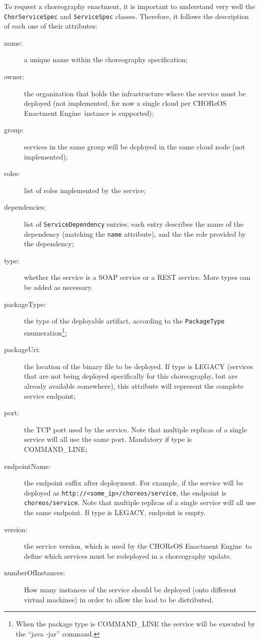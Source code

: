 \documentclass[a4paper, 10pt]{article}
\newcommand{\ee}{CHOReOS Enactment Engine}
\begin{document}
To request a choreography enactment, it is important to understand very well the \verb!ChorServiceSpec! and \verb!ServiceSpec! classes. Therefore, it follows the description of each one of their attributes:

\begin{description}
\item [name:] a unique name within the choreography specification;
\item [owner:] the organization that holds the infrastructure where the service must be deployed (not implemented, for now a single cloud per \ee\ instance is supported);
\item [group:] services in the same group will be deployed in the same cloud node (not implemented);
\item [roles:] list of roles implemented by the service;
\item [dependencies:] list of \verb!ServiceDependency! entries; each entry describes the name of the dependency (matching the \verb!name! attribute), and the the role provided by the dependency;
\item [type:] whether the service is a SOAP service or a REST service. More types can be added as necessary.
\item [packageType:] the type of the deployable artifact, according to the \verb!PackageType! enumeration\footnote{When the package type is COMMAND\_LINE the service will be executed by the ``java -jar'' command.};
\item [packageUri:] the location of the binary file to be deployed. If type is LEGACY (services that are not being deployed specifically for this choreography, but are already available somewhere), this attribute will represent the complete service endpoint;
\item [port:] the TCP port used by the service. Note that multiple replicas of a single service will all use the same port. Mandatory if type is COMMAND\_LINE;
\item [endpointName:] the endpoint suffix after deployment. For example, if the service will be deployed as \verb!http://<some_ip>/choreos/service!, the endpoint is \verb!choreos/service!. Note that multiple replicas of a single service will all use the same endpoint. If type is LEGACY, endpoint is empty.
\item [version:] the service version, which is used by the \ee\ to define which services must be redeployed in a choreography update.
\item [numberOfInstances:] How many instances of the service should be deployed (onto different virtual machines) in order to allow the load to be distributed.
\end{description}
\end{document}

